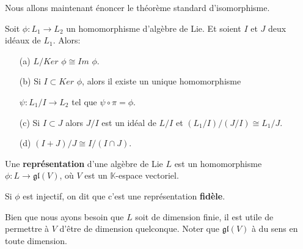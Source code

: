 \documentclass[a4paper,openany,12pt]{report}
\newcommand{\KK}{\mathbb{K}}
\newcommand{\gl}{\mathfrak{gl}}
\theoremstyle{break}
{\theorembodyfont{\upshape}
\newtheorem*{rmq}{Remarque :}
\newtheorem*{prv}{Preuve :}
\newtheorem*{ex}{Exemples :}
\newtheorem*{exe}{Exemple : }
\newtheorem*{nota}{Notation :}
\newtheorem*{dem}{D\'emonstration :}}
\begin{document}
\quad Nous allons maintenant énoncer le théorème standard d'isomorphisme.

\begin{thm}\label{thm:iso}
Soit $\phi: L_{1}  \to L_{2} $ un homomorphisme d'algèbre de Lie. Et soient $I$ et $J$ deux idéaux de $L_{1}$.
Alors: 
\begin{itemize}
\item[(a)] $L / Ker$ $\phi \cong Im$ $\phi$.
\item[(b)] Si $I \subset Ker$ $\phi$, alors il existe un unique homomorphisme 

$\psi: L_{1} / I \to L_{2} $ tel que $\psi \circ \pi= \phi$.
\item[(c)] Si $I \subset J$ alors $J / I$ est un idéal de $L/ I$ et $(L_{1} / I) /(J / I)\cong L_{1} / J$.
\item[(d)] $(I+J) / J \cong I /(I \cap J)$.
\end{itemize}
\end{thm}

\begin{df}
\quad  Une \textbf{représentation} d’une algèbre de Lie $L$ est un homomorphisme \\ $\phi: L \rightarrow \gl(V)$, où $V$ est un $\KK$-espace vectoriel.

Si $\phi$ est injectif, on dit que c'est une représentation  \textbf{fidèle}.
\end{df}

\quad Bien que nous ayons besoin que $L$ soit de dimension finie, il est utile de permettre à $V$ d'être de dimension quelconque. Noter que $\gl(V)$ à du sens en toute dimension.
\end{document}
